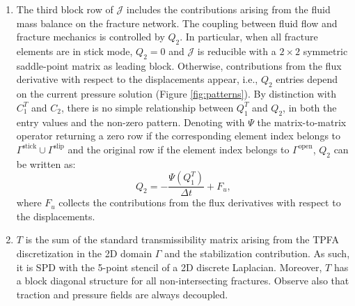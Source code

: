 \documentclass[3p,times]{elsarticle}
\theoremstyle{plain}
\newcommand{\Mat}[1]{#1}
\begin{document}
\begin{enumerate}
  \item The third block row of $\mathcal{J}$ includes the contributions arising from the fluid mass balance on the fracture network. The coupling between fluid flow and fracture mechanics is controlled by
  $\Mat{Q}_2$. In particular, when all fracture elements are in stick mode, $\Mat{Q}_2 = \Mat{0}$
  and $\mathcal{J}$ is reducible with a $2\times2$ symmetric saddle-point matrix as leading block. Otherwise, 
   contributions from the flux derivative with respect to
the displacements appear, i.e., $\Mat{Q}_2$ entries depend on the current pressure solution (Figure \ref{fig:patterns}). By distinction with $\Mat{C}_1^T$ and $\Mat{C}_2$, there is no simple relationship between $\Mat{Q}_1^T$ and $\Mat{Q}_2$, in both the entry values and the non-zero pattern. Denoting with $\Psi$ the matrix-to-matrix
operator returning a zero row if the corresponding element index belongs to
$\Gamma^{\text{stick}} \cup \Gamma^{\text{slip}}$ and the original row if the element index belongs to $\Gamma^{\text{open}}$,
$\Mat{Q}_2$ can be written as:
\begin{equation}
  \Mat{Q}_2 = -\frac{\Psi\left( \Mat{Q}_1^T \right)}{\Delta t} + \Mat{F}_u,
  \label{eq:Q2vsQ1}
\end{equation}
where $\Mat{F}_u$ collects the contributions from the flux derivatives with respect to the displacements.
  \item $\Mat{T}$ is the sum of the standard transmissibility matrix arising from the TPFA discretization in the 2D domain $\Gamma$ and the
    stabilization contribution. As such, it is SPD with the 5-point stencil of a 2D discrete Laplacian. Moreover, $\Mat{T}$ has a block diagonal structure for all non-intersecting fractures. Observe also that traction and pressure fields are always decoupled.
\end{enumerate}
\end{document}
